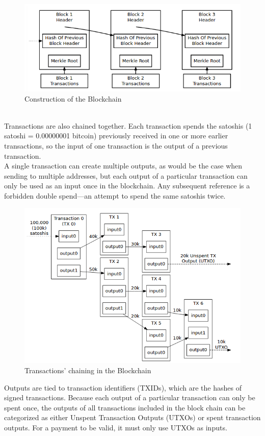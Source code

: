 \begin{figure}[htp]
    \includegraphics[scale=0.58]{merkle2}
    \hspace*{-2cm}
    \caption{Construction of the Blockchain }
\end{figure}
\\   
Transactions are also chained together. Each transaction spends the satoshis (1 satoshi = 0.00000001 bitcoin) previously received in one or more earlier transactions, so the input of one transaction is the output of a previous transaction. \\
A single transaction can create multiple outputs, as would be the case when sending to multiple addresses, but each output of a particular transaction can only be used as an input once in the blockchain. Any subsequent reference is a forbidden double spend—an attempt to spend the same satoshis twice.
\begin{figure}[htp]
    \includegraphics[scale=0.52]{merkle3}
    \hspace*{-2cm}
    \caption{Transactions' chaining in the Blockchain}
\end{figure} 
Outputs are tied to transaction identifiers (TXIDs), which are the hashes of signed transactions. Because each output of a particular transaction can only be spent once, the outputs of all transactions included in the block chain can be categorized as either Unspent Transaction Outputs (UTXOs) or spent transaction outputs. For a payment to be valid, it must only use UTXOs as inputs.\\
